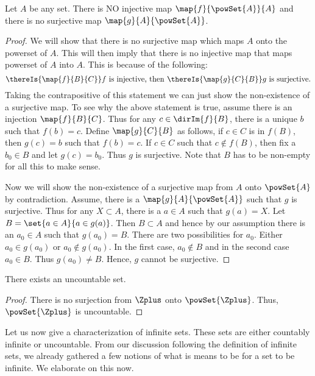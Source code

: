\begin{Theorem}
    Let $A$ be any set. There is NO injective map \break{}$\map{f}{\powSet{A}}{A}$ and there is no surjective map
    $\map{g}{A}{\powSet{A}}$.
\end{Theorem}
\begin{proof}
    We will show that there is no surjective map which maps $A$ onto the powerset of $A$. This will then imply
    that there is no injective map that maps powerset of $A$ into $A$. This is because of the following:
    \[\thereIs{\map{f}{B}{C}}\text{$f$ is injective, then}\hspace{0.05in}\thereIs{\map{g}{C}{B}}
	\text{$g$ is surjective}.\]
    Taking the contrapositive of this statement we can just show the non-existence of a surjective map. To
    see why the above statement is true, assume there is an injection $\map{f}{B}{C}$. Thus for any $c \in
    \dirIm{f}{B}$, there is a unique $b$ such that $f(b) = c$. Define $\map{g}{C}{B}$ as follows, if $c \in C$
    is in $f(B)$, then $g(c) = b$ such that $f(b) = c$. If $c \in C$ such that $c \not\in f(B)$, then fix a
    $b_0 \in B$ and let $g(c) = b_0$. Thus $g$ is surjective. Note that $B$ has to be non-empty for all this
    to make sense.

    Now we will show the non-existence of a surjective map from $A$ onto $\powSet{A}$ by contradiction. 
    Assume, there is a $\map{g}{A}{\powSet{A}}$ such that $g$ is surjective. Thus for any $X \subset A$, there
    is a $a \in A$ such that $g(a) = X$. Let $B = \set{a\in A}{a \in g(a)}$. Then $B \subset A$ and hence by
    our assumption there is an $a_0 \in A$ such that $g(a_0) = B$.
    There are two possibilities for $a_0$. Either $a_0 \in g(a_0)$ or $a_0 \not\in g(a_0)$. In the first case,
    $a_0 \not\in B$ and in the second case $a_0 \in B$. Thus $g(a_0)\neq B$. Hence, $g$ cannot be surjective.
\end{proof}
\begin{Corollary}
    There exists an uncountable set.
\end{Corollary}
\begin{proof}
    There is no surjection from $\Zplus$ onto $\powSet{\Zplus}$. Thus, $\powSet{\Zplus}$ is uncountable.
\end{proof}
Let us now give a characterization of infinite sets. These sets are either countably infinite or uncountable.
From our discussion following the definition of infinite sets, we already gathered a few notions of what is
means to be for a set to be infinite. We elaborate on this now.
